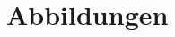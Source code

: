 \FloatBarrier
\section{Abbildungen}
\begin{comment}  %
	\begin{figure}[!h]
		\caption{CAPTION}
		\label{CHAP:TITLE}
		\resizebox{\textwidth}{!} {
		
		}
	\end{figure}
\end{comment}
\FloatBarrier
